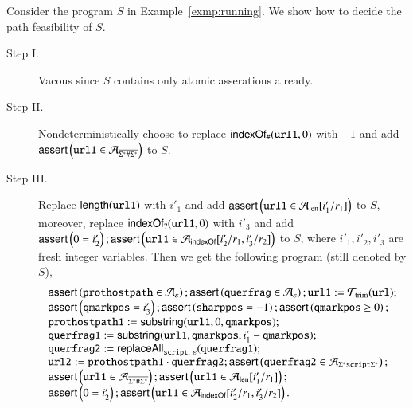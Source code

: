 \begin{example}
Consider the program $S$ in Example~\ref{exmp:running}.
We show how to decide the path feasibility of $S$. 
\begin{description}
\item[Step I.]   Vacous since $S$ contains only atomic asserations already. %
%
\item[Step II.] Nondeterministically choose to replace $\mathsf{indexOf}_\#(\mathtt{url1}, 0)$ with $-1$ and add $\textsf{assert}\left(\mathtt{url1} \in \mathcal{A}_{\overline{\Sigma^*\#\Sigma^*}}\right)$ to $S$.  
%
\item[Step III.] Replace $\mathsf{length}(\mathtt{url1})$ with $i'_1$ and add $\textsf{assert}\left(\mathtt{url1} \in \mathcal{A}_{\rm len}[i'_1/r_1]\right)$ to $S$, moreover, replace $\mathsf{indexOf}_?(\mathtt{url1}, 0)$ with $i'_3$ and add $\textsf{assert}\left(0= i'_2\right); \textsf{assert}\left(\mathtt{url1} \in \mathcal{A}_{\mathsf{indexOf}}[i'_2/r_1, i'_3/r_2]\right)$ to $S$, where $i'_1, i'_2, i'_3$ are fresh integer variables. Then we get the following program (still denoted by $S$), 
\[ 
\begin{array}{l}
    \ASSERT{\mathtt{prothostpath} \in \NFA_\varepsilon}; \ASSERT{\mathtt{querfrag} \in \NFA_\varepsilon}; \mathtt{url1} := \NFT_{\rm trim}(\mathtt{url}); \\
    \ASSERT{\mathtt{qmarkpos} = i'_3}; \ASSERT{\mathtt{sharppos} =-1 }; \ASSERT{\mathtt{qmarkpos} \ge 0}; \\ 
    \mathtt{prothostpath1} := \substring(\mathtt{url1}, 0, \mathtt{qmarkpos});\\
   \mathtt{querfrag1} := \substring(\mathtt{url1, qmarkpos}, i'_1 - \mathtt{qmarkpos});\\
    \mathtt{querfrag2} := \replaceall_{\mathtt{script},\ \varepsilon}(\mathtt{querfrag1});\\
    \mathtt{url2} := \mathtt{prothostpath1} \concat \mathtt{querfrag2}; \ASSERT{\mathtt{querfrag2} \in  \NFA_{\Sigma^*\mathtt{script}\Sigma^*}};  \\
    \ASSERT{\mathtt{url1} \in  \NFA_{\overline{\Sigma^*\#\Sigma^*}}}; \ASSERT{\mathtt{url1} \in \CEFA_{\rm len}[i'_1/r_1]}; \\
    \ASSERT{0= i'_2}; \ASSERT{\mathtt{url1} \in \CEFA_{\indexof}[i'_2/r_1, i'_3/r_2]}.

\end{array}\]
\end{description}
\end{example}
